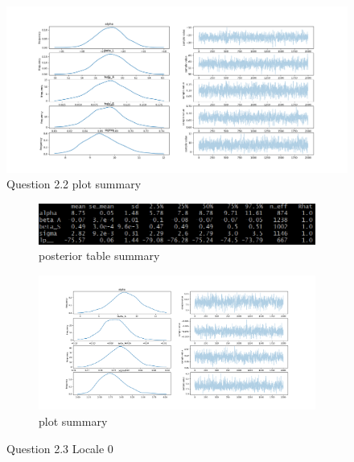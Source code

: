 \documentclass[11pt,a4paper,titlepage]{article}
\begin{document}
\begin{appendices}
    \begin{figure}[htb]
      \centering
        \includegraphics[width=\textwidth]{../q22/q22_plot_summary.png}
        \caption{Question 2.2 plot summary}
      \label{fig:2.2}
    \end{figure}

    \begin{figure}[htb]
      \centering
      \begin{subfigure}[b]{\textwidth}
        \centering
        \includegraphics[width=\textwidth]{../q23/q23_table_summary_L0.png}
        \caption{posterior table summary}
      \end{subfigure}
      \hfill
      \begin{subfigure}[b]{\textwidth}
        \centering
        \includegraphics[width=\textwidth]{../q23/q23_plot_summary_L0.png}
        \caption{plot summary}
      \end{subfigure}
      \caption{Question 2.3 Locale 0}
      \label{fig:2.3_0}
    \end{figure}


\end{appendices}
\end{document}
